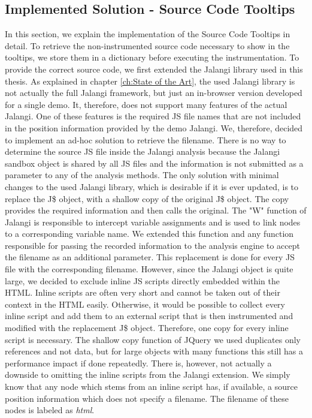 \subsection{Implemented Solution - Source Code Tooltips}
In this section, we explain the implementation of the Source Code Tooltips in detail. To retrieve the non-instrumented source code necessary to show in the tooltips, we store them in a dictionary before executing the instrumentation. To provide the correct source code, we first extended the Jalangi library used in this thesis. As explained in chapter \ref{ch:State of the Art}, the used Jalangi library is not actually the full Jalangi framework, but just an in-browser version developed for a single demo. It, therefore, does not support many features of the actual Jalangi. One of these features is the required JS file names that are not included in the position information provided by the demo Jalangi. We, therefore, decided to implement an ad-hoc solution to retrieve the filename. There is no way to determine the source JS file inside the Jalangi analysis because the Jalangi sandbox object is shared by all JS files and the information is not submitted as a parameter to any of the analysis methods. The only solution with minimal changes to the used Jalangi library, which is desirable if it is ever updated, is to replace the J\$ object, with a shallow copy of the original J\$ object. The copy provides the required information and then calls the original. The "W" function of Jalangi is responsible to intercept variable assignments and is used to link nodes to a corresponding variable name. We extended this function and any function responsible for passing the recorded information to the analysis engine to accept the filename as an additional parameter. This replacement is done for every JS file with the corresponding filename. However, since the Jalangi object is quite large, we decided to exclude inline JS scripts directly embedded within the HTML. Inline scripts are often very short and cannot be taken out of their context in the HTML easily. Otherwise, it would be possible to collect every inline script and add them to an external script that is then instrumented and modified with the replacement J\$ object. Therefore, one copy for every inline script is necessary. The shallow copy function of JQuery we used duplicates only references and not data, but for large objects with many functions this still has a performance impact if done repeatedly. There is, however, not actually a downside to omitting the inline scripts from the Jalangi extension. We simply know that any node which stems from an inline script has, if available, a source position information which does not specify a filename. The filename of these nodes is labeled as \emph{html}.\\
